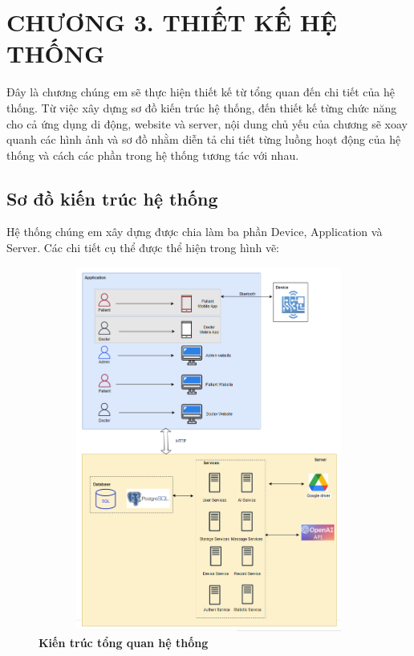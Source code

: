 
\section*{CHƯƠNG 3. THIẾT KẾ HỆ THỐNG}
\setcounter{section}{3}
\setcounter{subsection}{0} %
\setcounter{table}{0} %
\setcounter{figure}{0} %

Đây là chương chúng em sẽ thực hiện thiết kế từ tổng quan đến chi tiết của hệ thống. Từ việc xây dựng sơ đồ kiến trúc hệ thống,
đến thiết kế từng chức năng cho cả ứng dụng di động, website và server, nội dung chủ yếu của chương sẽ xoay quanh các hình
ảnh và sơ đồ nhằm diễn tả chi tiết từng luồng hoạt động của hệ thống và cách các phần trong hệ thống tương tác với nhau.

\subsection{Sơ đồ kiến trúc hệ thống}
Hệ thống chúng em xây dựng được chia làm ba phần Device, Application và Server. Các chi tiết cụ thể được thể hiện trong
hình vẽ:

\begin{figure}[H]
  \centering
  \includegraphics[width=12cm,height=12cm]{Images/system/fmECG_architecture-System_Architecture.png}
  \caption[Kiến trúc tổng quan hệ thống]{\bfseries \fontsize{12pt}{0pt}\selectfont Kiến trúc tổng quan hệ thống}
  \label{fmECG_architecture-System} %
\end{figure}

